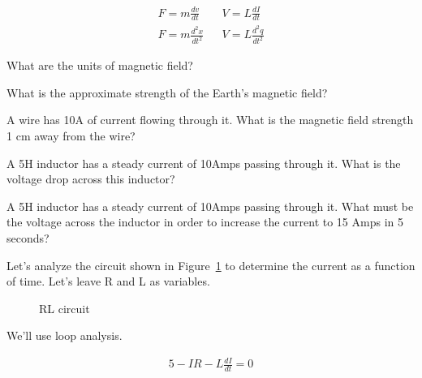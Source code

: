 \begin{align*}
F = m\frac{dv}{dt}&&V=L\frac{dI}{dt}\\
F = m\frac{d^2 x}{dt^2}&&V=L\frac{d^2 q}{dt^2}
\end{align*}

\begin{alevel}
What are the units of magnetic field?
\end{alevel}

\begin{blevel}
What is the approximate strength of the Earth's magnetic field?
\end{blevel}

\begin{clevel}
A wire has 10A of current flowing through it. What is the magnetic field strength 1 cm away from the wire?
\end{clevel}

\begin{alevel}
A 5H inductor has a steady current of 10Amps passing through it. What is the voltage drop across this inductor?
\end{alevel}

\begin{blevel}
A 5H inductor has a steady current of 10Amps passing through it. What must be the voltage across the inductor in order to increase the current to 15 Amps in 5 seconds? 
\end{blevel}

Let's analyze the circuit shown in Figure~\ref{F:6RL0} to determine the current as a function of time. Let's leave R and L as variables.

\begin{figure}[H]
\begin{center}
\caption{RL circuit}
\label{F:6RL0}
\end{center}
\end{figure}

We'll use loop analysis.

\begin{align}
5-IR - L\frac{dI}{dt}=0
\end{align}

